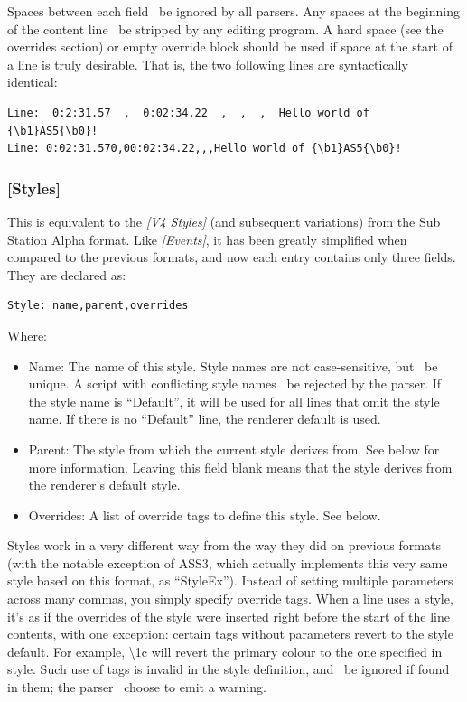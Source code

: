 \documentclass{spec}
\begin{document}
Spaces between each field \must\ be ignored by all parsers. Any spaces at the beginning of the
content line \should\ be stripped by any editing program. A hard space (see the overrides section) or empty
override block should be used if space at the start of a line is truly desirable. That is, the two
following lines are syntactically identical:

\begin{verbatim}
Line:  0:2:31.57  ,  0:02:34.22  ,  ,  ,  Hello world of {\b1}AS5{\b0}!
Line: 0:02:31.570,00:02:34.22,,,Hello world of {\b1}AS5{\b0}!
\end{verbatim}


\subsubsection{[Styles]}

This is equivalent to the \emph{[V4 Styles]} (and subsequent variations) from the Sub Station Alpha format.
Like \emph{[Events]}, it has been greatly simplified when compared to the previous formats, and now
each entry contains only three fields. They are declared as:

\begin{verbatim}
Style: name,parent,overrides
\end{verbatim}

Where:

\begin{itemize}
\item Name: The name of this style. Style names are not case-sensitive, but \must\ be unique. A
script with conflicting style names \must\ be rejected by the parser. If the style name is ``Default'', it
will be used for all lines that omit the style name. If there is no ``Default'' line, the renderer
default is used.
\item Parent: The style from which the current style derives from. See below for more information.
Leaving this field blank means that the style derives from the renderer's default style.
\item Overrides: A list of override tags to define this style. See below.
\end{itemize}

Styles work in a very different way from the way they did on previous formats (with the notable exception
of ASS3, which actually implements this very same style based on this format, as ``StyleEx'').
Instead of setting multiple parameters across many commas, you simply specify override tags. When a line
uses a style, it's as if the overrides of the style were inserted right before the start of the line
contents, with one exception: certain tags without parameters revert to the style default. For example,
\textbackslash 1c will revert the primary colour to the one specified in style. Such use of tags is invalid
in the style definition, and \must\ be ignored if found in them; the parser \may\ choose to emit a warning.
\end{document}
